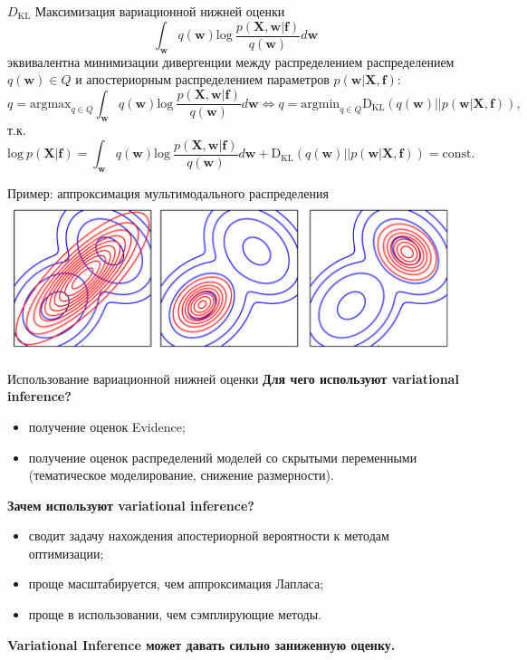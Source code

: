 \documentclass[10pt,pdf,utf8,russian,aspectratio=169]{beamer}
\begin{document}
\begin{frame}{$D_\text{KL}$}
Максимизация вариационной нижней оценки $$\int_{\mathbf{w}} q(\mathbf{w})\text{log}~\frac{p(\mathbf{X},\mathbf{w}|\mathbf{f})}{q(\mathbf{w})}d\mathbf{w}$$   эквивалентна минимизации дивергенции между распределением распределением $q(\mathbf{w}) \in Q$ и апостериорным распределением параметров $p(\mathbf{w}|\mathbf{X}, \mathbf{f})$:
\[
q = \text{argmax}_{q \in Q}\int_{\mathbf{w}} q(\mathbf{w})\text{log}~\frac{p(\mathbf{X},\mathbf{w}|\mathbf{f})}{q(\mathbf{w})}d\mathbf{w} \Leftrightarrow 	
q = \text{argmin}_{q \in Q} \text{D}_\text{KL}  (q(\mathbf{w})||p(\mathbf{w}| \mathbf{X}, \mathbf{f})),
\]
т.к.
$$\text{log}~p(\mathbf{X}| \mathbf{f})  = \int_{\mathbf{w}} q(\mathbf{w})\text{log}~\frac{p(\mathbf{X},\mathbf{w}|\mathbf{f})}{q(\mathbf{w})}d\mathbf{w} + \text{D}_\text{KL}  (q(\mathbf{w})||p(\mathbf{w}| \mathbf{X}, \mathbf{f})) = \text{const}.$$

\end{frame}

\begin{frame}{Пример: аппроксимация мультимодального распределения}
\includegraphics[width=\textwidth]{bishop.png}
\end{frame}




\begin{frame}{Использование вариационной нижней оценки}
\textbf{Для чего используют variational inference?}
\begin{itemize}
\item получение оценок Evidence;
\item получение оценок распределений моделей со скрытыми переменными (тематическое моделирование, снижение размерности).
\end{itemize}

\textbf{Зачем используют variational inference?}
\begin{itemize}
\item сводит задачу нахождения апостериорной вероятности к методам оптимизации;
\item проще масштабируется, чем аппроксимация Лапласа;
\item проще в использовании, чем сэмплирующие методы.
\end{itemize}
\textbf{Variational Inference может давать сильно заниженную оценку.}
\end{frame}
\end{document}
